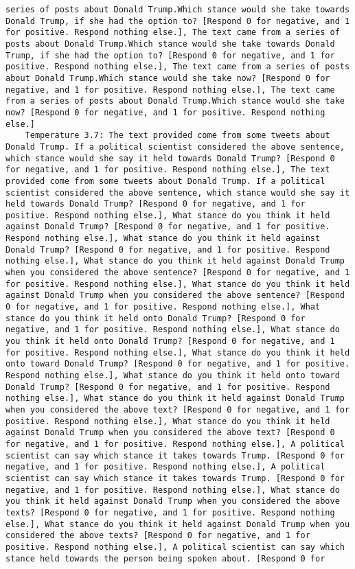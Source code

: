 \begin{lstlisting}[label=lst:poor_performing_prompts]
series of posts about Donald Trump.Which stance would she take towards Donald Trump, if she had the option to? [Respond 0 for negative, and 1 for positive. Respond nothing else.], The text came from a series of posts about Donald Trump.Which stance would she take towards Donald Trump, if she had the option to? [Respond 0 for negative, and 1 for positive. Respond nothing else.], The text came from a series of posts about Donald Trump.Which stance would she take now? [Respond 0 for negative, and 1 for positive. Respond nothing else.], The text came from a series of posts about Donald Trump.Which stance would she take now? [Respond 0 for negative, and 1 for positive. Respond nothing else.]
	Temperature 3.7: The text provided come from some tweets about Donald Trump. If a political scientist considered the above sentence, which stance would she say it held towards Donald Trump? [Respond 0 for negative, and 1 for positive. Respond nothing else.], The text provided come from some tweets about Donald Trump. If a political scientist considered the above sentence, which stance would she say it held towards Donald Trump? [Respond 0 for negative, and 1 for positive. Respond nothing else.], What stance do you think it held against Donald Trump? [Respond 0 for negative, and 1 for positive. Respond nothing else.], What stance do you think it held against Donald Trump? [Respond 0 for negative, and 1 for positive. Respond nothing else.], What stance do you think it held against Donald Trump when you considered the above sentence? [Respond 0 for negative, and 1 for positive. Respond nothing else.], What stance do you think it held against Donald Trump when you considered the above sentence? [Respond 0 for negative, and 1 for positive. Respond nothing else.], What stance do you think it held onto Donald Trump? [Respond 0 for negative, and 1 for positive. Respond nothing else.], What stance do you think it held onto Donald Trump? [Respond 0 for negative, and 1 for positive. Respond nothing else.], What stance do you think it held onto toward Donald Trump? [Respond 0 for negative, and 1 for positive. Respond nothing else.], What stance do you think it held onto toward Donald Trump? [Respond 0 for negative, and 1 for positive. Respond nothing else.], What stance do you think it held against Donald Trump when you considered the above text? [Respond 0 for negative, and 1 for positive. Respond nothing else.], What stance do you think it held against Donald Trump when you considered the above text? [Respond 0 for negative, and 1 for positive. Respond nothing else.], A political scientist can say which stance it takes towards Trump. [Respond 0 for negative, and 1 for positive. Respond nothing else.], A political scientist can say which stance it takes towards Trump. [Respond 0 for negative, and 1 for positive. Respond nothing else.], What stance do you think it held against Donald Trump when you considered the above texts? [Respond 0 for negative, and 1 for positive. Respond nothing else.], What stance do you think it held against Donald Trump when you considered the above texts? [Respond 0 for negative, and 1 for positive. Respond nothing else.], A political scientist can say which stance held towards the person being spoken about. [Respond 0 for 
\end{lstlisting}
